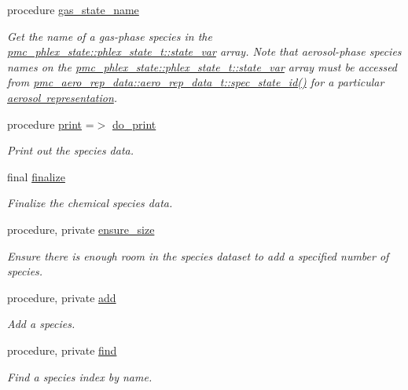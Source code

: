 \begin{DoxyCompactItemize}
procedure \mbox{\hyperlink{structpmc__chem__spec__data_1_1chem__spec__data__t_ab43a6f3cc64bf210fc386334d36efa31}{gas\+\_\+state\+\_\+name}}
\begin{DoxyCompactList}\small\item\em Get the name of a gas-\/phase species in the {\ttfamily \mbox{\hyperlink{structpmc__phlex__state_1_1phlex__state__t_a78835cb552d483ebbfc7a6bc6f756918}{pmc\+\_\+phlex\+\_\+state\+::phlex\+\_\+state\+\_\+t\+::state\+\_\+var}}} array. Note that aerosol-\/phase species names on the {\ttfamily \mbox{\hyperlink{structpmc__phlex__state_1_1phlex__state__t_a78835cb552d483ebbfc7a6bc6f756918}{pmc\+\_\+phlex\+\_\+state\+::phlex\+\_\+state\+\_\+t\+::state\+\_\+var}}} array must be accessed from {\ttfamily \mbox{\hyperlink{structpmc__aero__rep__data_1_1aero__rep__data__t_a6dcaf48caeaaed60aa065a0fac6c7ffc}{pmc\+\_\+aero\+\_\+rep\+\_\+data\+::aero\+\_\+rep\+\_\+data\+\_\+t\+::spec\+\_\+state\+\_\+id()}}} for a particular \mbox{\hyperlink{phlex_aero_rep}{aerosol representation}}. \end{DoxyCompactList}\item 
procedure \mbox{\hyperlink{structpmc__chem__spec__data_1_1chem__spec__data__t_a3a0969f7711a884e66bd0cccbea9a95e}{print}} =$>$ \mbox{\hyperlink{namespacepmc__chem__spec__data_a241ef4f3c9e0a1968b339df331ca8d64}{do\+\_\+print}}
\begin{DoxyCompactList}\small\item\em Print out the species data. \end{DoxyCompactList}\item 
final \mbox{\hyperlink{structpmc__chem__spec__data_1_1chem__spec__data__t_abe90c93d2601cb47a064604eb077e1e7}{finalize}}
\begin{DoxyCompactList}\small\item\em Finalize the chemical species data. \end{DoxyCompactList}\item 
procedure, private \mbox{\hyperlink{structpmc__chem__spec__data_1_1chem__spec__data__t_acd920b7fc3f5146f52091f6c8172d4f9}{ensure\+\_\+size}}
\begin{DoxyCompactList}\small\item\em Ensure there is enough room in the species dataset to add a specified number of species. \end{DoxyCompactList}\item 
procedure, private \mbox{\hyperlink{structpmc__chem__spec__data_1_1chem__spec__data__t_a4c187446dfaf46c8395bbdcd4db03244}{add}}
\begin{DoxyCompactList}\small\item\em Add a species. \end{DoxyCompactList}\item 
procedure, private \mbox{\hyperlink{structpmc__chem__spec__data_1_1chem__spec__data__t_af6e3628cbd26bd3f8f67228cb879a293}{find}}
\begin{DoxyCompactList}\small\item\em Find a species index by name. \end{DoxyCompactList}\end{DoxyCompactItemize}
